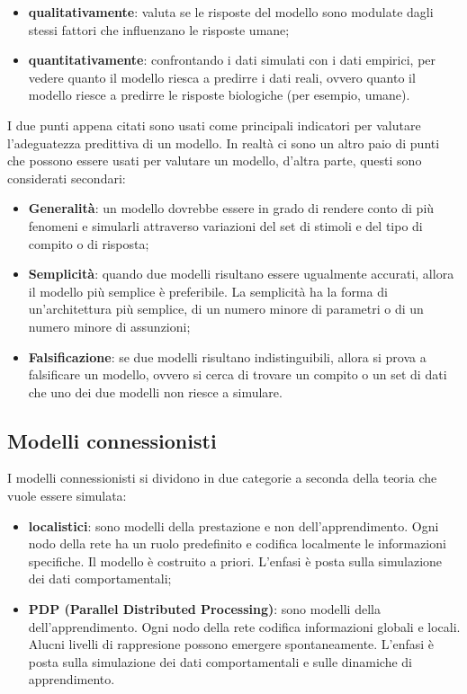 \begin{itemize}
	\item \textbf{qualitativamente}: valuta se le risposte del modello sono 
		modulate dagli stessi fattori che influenzano le risposte umane;

	\item \textbf{quantitativamente}: confrontando i dati simulati con i dati
		empirici, per vedere quanto il modello riesca a predirre i dati reali,
		ovvero quanto il modello riesce a predirre le risposte biologiche (per
		esempio, umane).
\end{itemize}

I due punti appena citati sono usati come principali indicatori per valutare
l'adeguatezza predittiva di un modello. In realtà ci sono un altro paio di punti
che possono essere usati per valutare un modello, d'altra parte, questi sono
considerati secondari:

\begin{itemize}
	\item \textbf{Generalità}: un modello dovrebbe essere in grado di rendere
		conto di più fenomeni e simularli attraverso variazioni del set di
		stimoli e del tipo di compito o di risposta;

	\item \textbf{Semplicità}: quando due modelli risultano essere ugualmente
		accurati, allora il modello più semplice è preferibile. La semplicità ha
		la forma di un'architettura più semplice, di un numero minore di
		parametri o di un numero minore di assunzioni;

	\item \textbf{Falsificazione}: se due modelli risultano indistinguibili,
		allora si prova a falsificare un modello, ovvero si cerca di trovare un
		compito o un set di dati che uno dei due modelli non riesce a 
		simulare. 
\end{itemize}

\subsection{Modelli connessionisti}

I modelli connessionisti si dividono in due categorie a seconda della teoria che
vuole essere simulata:
\begin{itemize}
	\item \textbf{localistici}: sono modelli della prestazione e non
	dell'apprendimento. Ogni nodo della rete ha un ruolo predefinito e codifica
	localmente le informazioni specifiche. Il modello è costruito a priori.
	L'enfasi è posta sulla simulazione dei dati comportamentali;

	\item \textbf{PDP (Parallel Distributed Processing)}: sono modelli della
		dell'apprendimento. Ogni nodo della rete codifica
		informazioni globali e locali. Alucni livelli di rappresione possono
		emergere spontaneamente. L'enfasi è posta sulla simulazione dei dati
		comportamentali e sulle dinamiche di apprendimento.
\end{itemize}
